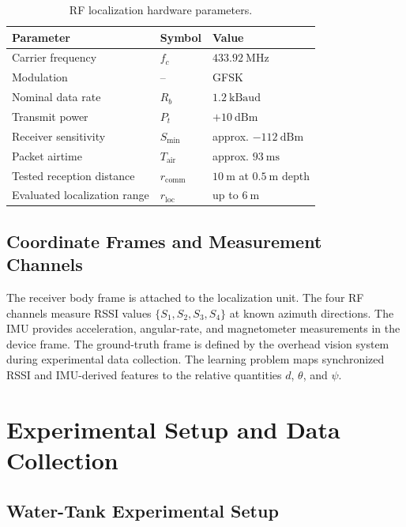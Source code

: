 \documentclass{uhcoethesis}
\begin{document}
\begin{table}[t]
    \centering
    \caption{RF localization hardware parameters.}
    \label{tab:ch5_rf_parameters}
    \begin{tabular}{lll}
        \hline
        Parameter & Symbol & Value \\
        \hline
        Carrier frequency & $f_c$ & $433.92~\mathrm{MHz}$ \\
        Modulation & -- & GFSK \\
        Nominal data rate & $R_b$ & $1.2~\mathrm{kBaud}$ \\
        Transmit power & $P_t$ & $+10~\mathrm{dBm}$ \\
        Receiver sensitivity & $S_{\min}$ & approx. $-112~\mathrm{dBm}$ \\
        Packet airtime & $T_{\mathrm{air}}$ & approx. $93~\mathrm{ms}$ \\
        Tested reception distance & $r_{\mathrm{comm}}$ & $10~\mathrm{m}$ at $0.5~\mathrm{m}$ depth \\
        Evaluated localization range & $r_{\mathrm{loc}}$ & up to $6~\mathrm{m}$ \\
        \hline
    \end{tabular}
\end{table}

\subsection{Coordinate Frames and Measurement Channels}

The receiver body frame is attached to the localization unit. The four RF channels measure RSSI values $\{S_1,S_2,S_3,S_4\}$ at known azimuth directions. The IMU provides acceleration, angular-rate, and magnetometer measurements in the device frame. The ground-truth frame is defined by the overhead vision system during experimental data collection. The learning problem maps synchronized RSSI and IMU-derived features to the relative quantities $d$, $\theta$, and $\psi$.

\section{Experimental Setup and Data Collection}

\subsection{Water-Tank Experimental Setup}
\end{document}
